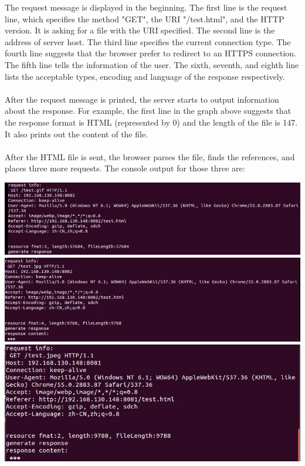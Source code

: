 \documentclass[a4paper, 11pt]{report}
\begin{document}
\noindent The request message is displayed in the beginning. The first line is the request line, which specifies the method "GET", the URI "/test.html", and the HTTP version. It is asking for a file with the URI specified. The second line is the address of server host. The third line specifies the current connection type. The fourth line suggests that the browser prefer to redirect to an HTTPS connection. The fifth line tells the information of the user. The sixth, seventh, and eighth line lists the acceptable types, encoding and language of the response respectively.\\\\

\noindent After the request message is printed, the server starts to output information about the response. For example, the first line in the graph above suggests that the response format is HTML (represented by 0) and the length of the file is 147. It also prints out the content of the file.\\\\

\noindent After the HTML file is sent, the browser parses the file, finds the references, and places three more requests. The console output for those three are:

\noindent \includegraphics[scale=0.54]{GIF_test.jpg}\\
\includegraphics[scale=0.54]{JPG_test.jpg}\\
\includegraphics[scale=0.54]{JPEG_test.jpg}\\
\end{document}
